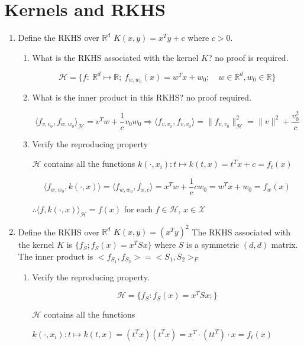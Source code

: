 \documentclass[11pt]{article}
\begin{document}
\section{Kernels and RKHS}
\begin{enumerate}
\item Define the RKHS  over $\mathbb{R}^d$ $K(x,y)=x^Ty+c$ where $c>0$. 

\begin{enumerate}
\item What is the RKHS associated with the kernel $K$? no proof is required. 

$$\mathcal{H} = \{f:\ \mathbb{R}^d\mapsto\mathbb{R};\ f_{w,w_0}(x)=w^Tx+w_0;\quad w\in\mathbb{R}^d,w_0\in\mathbb{R}\}$$





\item What is the inner product in this RKHS? no proof required.  

$$\langle f_{v,v_0},f_{w,w_0}\rangle_{\mathcal{H}}=v^Tw+\frac1cv_0w_0\Rightarrow\langle f_{v,v_0},f_{v,v_0}\rangle=\|f_{v,v_0}\|^2_{\mathcal{H}}=\|v\|^2+\frac{v_0^2}c$$


\item Verify the reproducing property

$\mathcal{H}$ contains all the functions $k(\cdot,x_i): t\mapsto k(t,x)=t^Tx+c=f_t(x)$

$$\langle f_{w,w_0},k(\cdot,x)\rangle=\langle f_{w,w_0},f_{x,c}\rangle=x^Tw+\frac1ccw_0=w^Tx+w_0=f_w(x)$$

$\therefore\langle f,k(\cdot,x)\rangle_{\mathcal{H}}=f(x)$ for each $f\in\mathcal{H}$, $x\in\mathcal{X}$

\end{enumerate}


\item Define the RKHS  over $\mathbb{R}^d$
$K(x,y)=(x^Ty)^2$
The RKHS associated with the kernel $K$ is $\{f_S;f_S(x)=x^T S x\}$ where $S$ is a symmetric $(d,d)$ matrix. The inner product is
$<f_{S_1},f_{S_2}>=<S_1,S_2>_F$



\begin{enumerate}
\item Verify the reproducing property. 

$$\mathcal{H} = \{f_S: f_S(x)=x^TS x;\}$$

$\mathcal{H}$ contains all the functions 

$k(\cdot,x_i): t\mapsto k(t,x)=(t^Tx)(t^Tx)=x^T\cdot (tt^T)\cdot x=f_t(x)$


\end{enumerate}
\end{enumerate}
\end{document}
